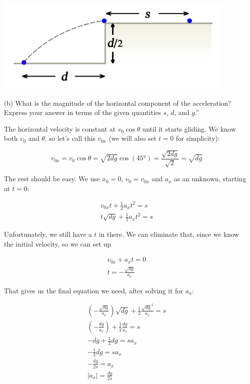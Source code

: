 \documentclass[12pt,a4paper]{report}
\begin{document}
\begin{center}
\includegraphics[scale=0.6]{Graphics/h2p3_2}
\end{center}

(b) What is the magnitude of the horizontal component of the acceleration? Express your answer in terms of the given quantities $s$, $d$, and $g$.''

The horizontal velocity is constant at $v_0 \cos \theta$ until it starts gliding. We know both $v_0$ and $\theta$, so let's call this $v_{0x}$ (we will also set $t = 0$ for simplicity):

\begin{equation}
v_{0x} = v_0 \cos \theta = \sqrt{2 d g} \cos( \ang{45}) = \frac{\sqrt{2 d g}}{\sqrt{2}} = \sqrt{d g}
\end{equation}

The rest should be easy. We use $x_0 = 0$, $v_0 = v_{0x}$ and $a_x$ as an unknown, starting at $t = 0$:

\begin{align} 
v_{0x} t + \frac{1}{2} a_x t^2 = s\\
t \sqrt{d g} + \frac{1}{2} a_x t^2 = s
\end{align}

Unfortunately, we still have a $t$ in there. We can eliminate that, since we know the initial velocity, so we can set up

\begin{align}
v_{0x} + a_x t = 0\\
t = -\frac{\sqrt{d g}}{a_x}
\end{align}

That gives us the final equation we need, after solving it for $a_x$:

\begin{align}
\left(-\frac{\sqrt{d g}}{a_x}\right) \sqrt{d g} + \frac{1}{2} \frac{\sqrt{d g}^2}{a_x} = s\\
\left(-\frac{d g}{a_x}\right) + \frac{1}{2} \frac{d g}{a_x} = s\\
-d g + \frac{1}{2} d g = s a_x\\
- \frac{1}{2} d g = s a_x\\
- \frac{d g}{2s} = a_x\\
|a_x| = \frac{d g}{2s}
\end{align}
\end{document}
